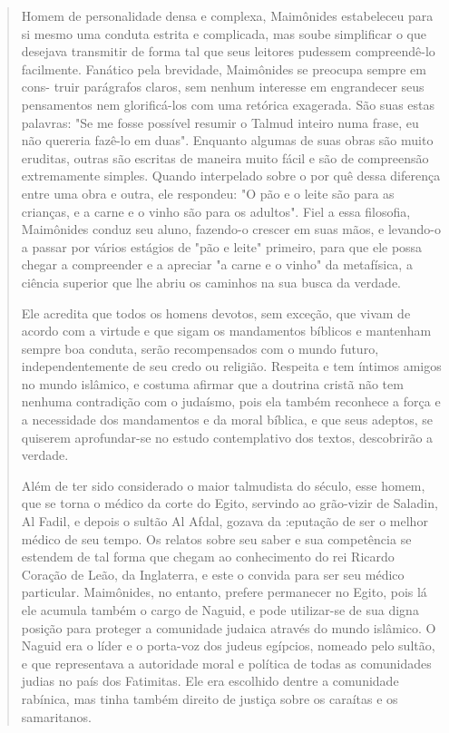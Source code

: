 \begin{quote}
Homem de personalidade densa e complexa, Maimônides estabele­ceu para si
mesmo uma conduta estrita e complicada, mas soube simplificar o que
desejava transmitir de forma tal que seus leitores pudessem
compreendê-lo facilmente. Fanático pela brevidade, Maimônides se
preocupa sempre em cons-
truir parágrafos claros, sem nenhum interesse em engrandecer seus
pensamen­tos nem glorificá-los com uma retórica exagerada. São suas
estas palavras: "Se me fosse possível resumir o Talmud inteiro numa
frase, eu não quereria fazê-lo em duas". Enquanto algumas de suas obras
são muito eruditas, outras são escri­tas de maneira muito fácil e são de
compreensão extremamente simples. Quan­do interpelado sobre o por quê
dessa diferença entre uma obra e outra, ele res­pondeu: "O pão e o leite
são para as crianças, e a carne e o vinho são para os adultos". Fiel a
essa filosofia, Maimônides conduz seu aluno, fazendo-o crescer em suas
mãos, e levando-o a passar por vários estágios de "pão e leite"
primeiro, para que ele possa chegar a compreender e a apreciar "a carne
e o vinho" da metafísica, a ciência superior que lhe abriu os caminhos
na sua busca da verdade.

Ele acredita que todos os homens devotos, sem exceção, que vivam de
acordo com a virtude e que sigam os mandamentos bíblicos e mantenham
sempre boa conduta, serão recompensados com o mundo futuro,
independen­temente de seu credo ou religião. Respeita e tem íntimos
amigos no mundo islâmico, e costuma afirmar que a doutrina cristã não
tem nenhuma contradi­ção com o judaísmo, pois ela também reconhece a
força e a necessidade dos mandamentos e da moral bíblica, e que seus
adeptos, se quiserem aprofundar-se no estudo contemplativo dos textos,
descobrirão a verdade.

Além de ter sido considerado o maior talmudista do século, esse ho­mem,
que se torna o médico da corte do Egito, servindo ao grão-vizir de
Sala­din, Al Fadil, e depois o sultão Al Afdal, gozava da :eputação de
ser o melhor médico de seu tempo. Os relatos sobre seu saber e sua
competência se esten­dem de tal forma que chegam ao conhecimento do rei
Ricardo Coração de Leão, da Inglaterra, e este o convida para ser seu
médico particular. Maimônides, no entanto, prefere permanecer no Egito,
pois lá ele acumula também o cargo de Naguid, e pode utilizar-se de sua
digna posição para proteger a comunidade ju­daica através do mundo
islâmico. O Naguid era o líder e o porta-voz dos judeus egípcios,
nomeado pelo sultão, e que representava a autoridade moral e políti­ca
de todas as comunidades judias no país dos Fatimitas. Ele era escolhido
den­tre a comunidade rabínica, mas tinha também direito de justiça sobre
os caraí­tas e os samaritanos.


\end{quote}
